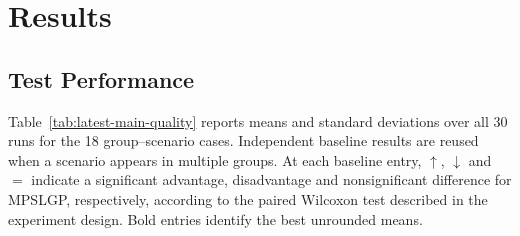 \documentclass[10pt,journal]{IEEEtran}
\begin{document}
% 
% 

% 


\section{Results}
\label{sec:results}

\subsection{Test Performance}
Table~\ref{tab:latest-main-quality} reports means and standard deviations over all 30 runs for the 18 group--scenario cases. Independent baseline results are reused when a scenario appears in multiple groups. At each baseline entry, $\uparrow$, $\downarrow$ and $=$ indicate a significant advantage, disadvantage and nonsignificant difference for MPSLGP, respectively, according to the paired Wilcoxon test described in the experiment design. Bold entries identify the best unrounded means.
\end{document}
